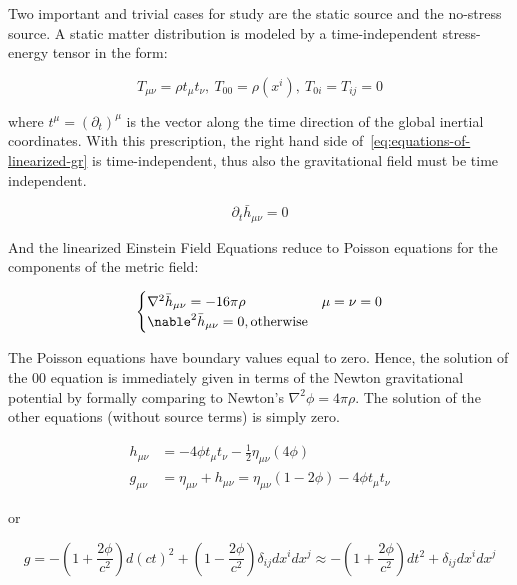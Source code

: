 Two important and trivial cases for study are the static source and the no-stress source.
A static matter distribution is modeled by a time-independent stress-energy tensor in the form:

\begin{equation}
    T_{\mu\nu} = \rho t_{\mu}t_{\nu}, \ T_{00} = \rho(x^i), \ T_{0i}= T_{ij} = 0\label{eq:static-source}
\end{equation}

where $t^\mu = (\partial_t)^\mu$ is the vector along the time direction of the global inertial coordinates.
With this prescription, the right hand side of~\ref{eq:equations-of-linearized-gr} is time-independent, thus also the gravitational field must be time independent.

\begin{equation}
    \partial_t\bar h_{\mu\nu} = 0\label{eq:time-independent-metric}
\end{equation}

And the linearized Einstein Field Equations reduce to Poisson equations for the components of the metric field:

\begin{equation}
    \begin{cases}
        \nabla^2\bar h_{\mu\nu} = -16\pi\rho & \mu=\nu=0\\
        \nable^2\bar h_{\mu\nu} = 0, \text{otherwise}
    \end{cases}\label{eq:linearized-answers-static-source}
\end{equation}

The Poisson equations have boundary values equal to zero.
Hence, the solution of the $00$ equation is immediately given in terms of the Newton gravitational potential by formally comparing to Newton's $\nabla^2\phi = 4\pi\rho$.
The solution of the other equations (without source terms) is simply zero.

\begin{align}
    h_{\mu\nu} &= -4\phi t_{\mu} t_{\nu} -\frac12 \eta_{\mu\nu}(4\phi)\\
    g_{\mu\nu} &= \eta_{\mu\nu} + h_{\mu\nu} = \eta_{\mu\nu}\left(1-2\phi \right) - 4\phi t_{\mu}t_{\nu}
\end{align}

or

\begin{equation}
    g = -\left(1 + \frac{2\phi}{c^2}\right)d(ct)^2 + \left(
                                                         1-\frac{2\phi}{c^2}
    \right)\delta_{ij}dx^i dx^j \approx -\left(1+\frac{2\phi}{c^2}\right)dt^2 +\delta_{ij}dx^i dx^j\label{eq:static-source-solution}
\end{equation}

